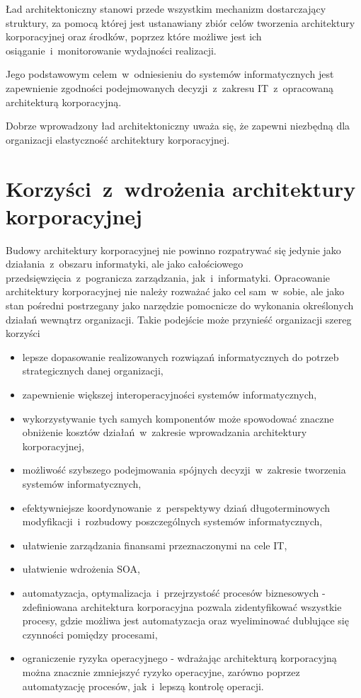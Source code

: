Ład architektoniczny stanowi przede wszystkim mechanizm dostarczający struktury, za pomocą której jest ustanawiany zbiór celów tworzenia architektury korporacyjnej oraz środków, poprzez które możliwe jest ich osiąganie~i~monitorowanie wydajności realizacji. 

Jego podstawowym celem~w~odniesieniu do systemów informatycznych jest zapewnienie zgodności podejmowanych decyzji~z~zakresu IT~z~opracowaną architekturą korporacyjną. 

Dobrze wprowadzony ład architektoniczny uważa się, że zapewni niezbędną dla organizacji elastyczność architektury korporacyjnej.

\section{Korzyści~z~wdrożenia architektury korporacyjnej}
Budowy architektury korporacyjnej nie powinno rozpatrywać się jedynie jako działania~z~obszaru informatyki, ale jako całościowego przedsięwzięcia~z~pogranicza zarządzania, jak~i~informatyki. Opracowanie architektury korporacyjnej nie należy rozważać jako cel sam~w~sobie, ale jako stan pośredni postrzegany jako narzędzie pomocnicze do wykonania określonych działań wewnątrz organizacji. Takie podejście może przynieść organizacji szereg korzyści
\begin{itemize}
\item{lepsze dopasowanie realizowanych rozwiązań informatycznych do potrzeb strategicznych danej organizacji,}
\item{zapewnienie większej interoperacyjności systemów informatycznych,}
\item{wykorzystywanie tych samych komponentów może spowodować znaczne obniżenie kosztów działań~w~zakresie wprowadzania architektury korporacyjnej,}
\item{możliwość szybszego podejmowania spójnych decyzji~w~zakresie tworzenia systemów informatycznych,}
\item{efektywniejsze koordynowanie~z~perspektywy dziań długoterminowych modyfikacji~i~rozbudowy poszczególnych systemów informatycznych,}
\item{ułatwienie zarządzania finansami przeznaczonymi na cele IT,}
\item{ułatwienie wdrożenia SOA,}
\item{automatyzacja, optymalizacja~i~przejrzystość procesów biznesowych - zdefiniowana architektura korporacyjna pozwala zidentyfikować wszystkie procesy, gdzie możliwa jest automatyzacja oraz wyeliminować dublujące się czynności pomiędzy procesami,}
\item{ograniczenie ryzyka operacyjnego - wdrażając architekturą korporacyjną można znacznie zmniejszyć ryzyko operacyjne, zarówno poprzez automatyzację procesów, jak~i~lepszą kontrolę operacji.}
\end{itemize}

